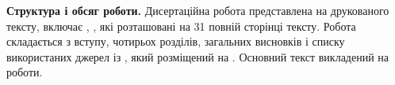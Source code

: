 \else


\textbf{Структура і обсяг роботи.} Дисертаційна робота представлена на  друкованого тексту, включає , , які розташовані на 31 повній сторінці тексту. Робота складається з вступу, чотирьох розділів, загальних висновків і списку використаних джерел із , який розміщений на . Основний текст викладений на  роботи.

\fi

